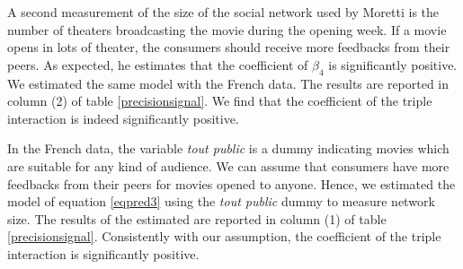 A second measurement of the size of the social network used by Moretti is the number of theaters broadcasting the movie during the opening week.
If a movie opens in lots of theater, the consumers should receive more feedbacks from their peers.
As expected, he estimates that the coefficient of $\beta_4$ is significantly positive.
We estimated the same model with the French data.
The results are reported in column (2) of table \ref{precisionsignal}.
We find that the coefficient of the triple interaction is indeed significantly positive.

In the French data, the variable \textit{tout public} is a dummy indicating movies which are suitable for any kind of audience.
We can assume that consumers have more feedbacks from their peers for movies opened to anyone.
Hence, we estimated the model of equation \ref{eqpred3} using the \textit{tout public} dummy to measure network size.
The results of the estimated are reported in column (1) of table \ref{precisionsignal}.
Consistently with our assumption, the coefficient of the triple interaction is significantly positive.

